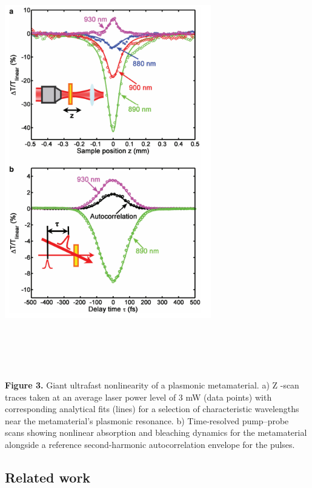 \documentclass[]{article}
\begin{document}
\centerline{\includegraphics[width=9cm,height=18cm]{image/001_03.png}}
\textbf{Figure 3.} Giant ultrafast nonlinearity of a plasmonic
metamaterial. a) Z -scan traces taken at an average laser power level of
3 mW (data points) with corresponding analytical fits (lines) for a
selection of characteristic wavelengths near the metamaterial's
plasmonic resonance. b) Time-resolved pump--probe scans showing
nonlinear absorption and bleaching dynamics for the metamaterial
alongside a reference second-harmonic autocorrelation envelope for the
pulses.

\subsection{Related work}\label{related-work}
\end{document}

